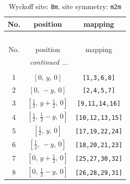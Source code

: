 \documentclass[fleqn,8pt]{jsarticle}
\begin{document}
\begin{longtable}{ccc}
\caption{Wyckoff site: {\tt 8m}, site symmetry: {\tt m2m}}
 \\
 \hline \hline
No. & position & mapping \\ \hline \endfirsthead

\multicolumn{2}{l}{\tablename\ \thetable{}} \\
 \hline \hline
No. & position & mapping \\ \hline \endhead

 \hline \hline
\multicolumn{2}{r}{\footnotesize\it continued ...} \\ \endfoot

 \hline \hline
\multicolumn{2}{r}{} \\ \endlastfoot

1 & $\left[ 0,\, y,\, 0 \right]$ & {\tt [1,3,6,8]} \\ \hline
2 & $\left[ 0,\, - y,\, 0 \right]$ & {\tt [2,4,5,7]} \\ \hline
3 & $\left[ \frac{1}{2},\, y + \frac{1}{2},\, 0 \right]$ & {\tt [9,11,14,16]} \\ \hline
4 & $\left[ \frac{1}{2},\, \frac{1}{2} - y,\, 0 \right]$ & {\tt [10,12,13,15]} \\ \hline
5 & $\left[ \frac{1}{2},\, y,\, 0 \right]$ & {\tt [17,19,22,24]} \\ \hline
6 & $\left[ \frac{1}{2},\, - y,\, 0 \right]$ & {\tt [18,20,21,23]} \\ \hline
7 & $\left[ 0,\, y + \frac{1}{2},\, 0 \right]$ & {\tt [25,27,30,32]} \\ \hline
8 & $\left[ 0,\, \frac{1}{2} - y,\, 0 \right]$ & {\tt [26,28,29,31]} \\
\end{longtable}
\renewcommand{\arraystretch}{1.2}
\end{document}
